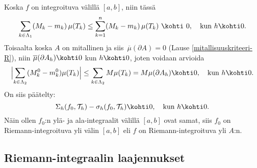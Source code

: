 Koska $f$ on integroituva välillä $[a,b]$, niin tässä
\[
\sum_{k\in\Lambda_1}(M_k-m_k)\,\mu(T_k) \le \sum_{k=1}^n(M_k-m_k)\,\mu(T_k)\ 
                                        \kohti\ 0, \quad \text{kun}\ h \kohti 0.
\]
Toisaalta koska $A$ on mitallinen ja siis $\,\overline{\mu}(\partial A)=0$ 
(Lause \ref{mitallisuuskriteeri-R}), niin \newline
$\overline{\mu}(\partial A_h) \kohti 0$ kun $ h \kohti 0$, joten voidaan arvioida
\[
\Bigl|\sum_{k\in\Lambda_2}(M_k^0-m_k^0)\mu(T_k)\Bigr| \le \sum_{k\in\Lambda_2} M\mu(T_k) 
                             = M\mu(\partial A_h) \kohti 0, \quad \text{kun}\ h \kohti 0.
\]
On siis päätelty:
\[
\Sigma_h(f_0,\mathcal{T}_h)-\sigma_h(f_0,\mathcal{T}_h) \kohti 0, \quad \text{kun}\ h \kohti 0.
\]
Näin ollen $f_0$:n ylä- ja ala-integraalit välillä $[a,b]$ ovat samat, siis $f_0$ on 
Riemann-integroituva yli välin $[a,b]$ eli $f$ on Riemann-integroituva yli $A$:n. \loppu

\subsection*{Riemann-integraalin laajennukset}

